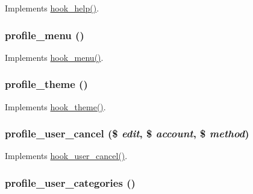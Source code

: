 \label{profile_8module_a4c94451892aa2b5dd6b36c8a3f9fbe5a}
Implements \hyperlink{group__hooks_ga5589c2714a782738e8851c4c90231f0e}{hook\_\-help()}. \hypertarget{profile_8module_a4703cb223d8cfa6329eda4053cd64d5a}{
\subsubsection[{profile\_\-menu}]{\setlength{\rightskip}{0pt plus 5cm}profile\_\-menu ()}}
\label{profile_8module_a4703cb223d8cfa6329eda4053cd64d5a}
Implements \hyperlink{group__hooks_ga5c95244fea59b25666e409759e133ded}{hook\_\-menu()}. \hypertarget{profile_8module_a50e30bbdc9ffae1d3251a8ff035b43a9}{
\subsubsection[{profile\_\-theme}]{\setlength{\rightskip}{0pt plus 5cm}profile\_\-theme ()}}
\label{profile_8module_a50e30bbdc9ffae1d3251a8ff035b43a9}
Implements \hyperlink{group__hooks_ga013ccb45c7aaab1c16cf9691428c910d}{hook\_\-theme()}. \hypertarget{profile_8module_a957dcbcb6fa2fcc754d06373f1c75037}{
\subsubsection[{profile\_\-user\_\-cancel}]{\setlength{\rightskip}{0pt plus 5cm}profile\_\-user\_\-cancel (\$ {\em edit}, \/  \$ {\em account}, \/  \$ {\em method})}}
\label{profile_8module_a957dcbcb6fa2fcc754d06373f1c75037}
Implements \hyperlink{group__hooks_gad6223ddd2f0f52c331df8a3315d9a41e}{hook\_\-user\_\-cancel()}. \hypertarget{profile_8module_ace541ae41831d349df58b346e5945bf1}{
\subsubsection[{profile\_\-user\_\-categories}]{\setlength{\rightskip}{0pt plus 5cm}profile\_\-user\_\-categories ()}}

